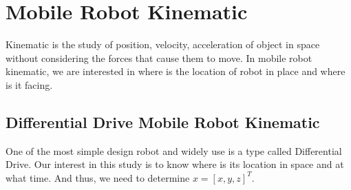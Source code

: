 \chapter{Mobile Robot Kinematic}
Kinematic is the study of position, velocity, acceleration of object in space without considering the forces that cause them to move. In mobile robot kinematic, we are interested in where is the location of robot in place and where is it facing.

\section{Differential Drive Mobile Robot Kinematic}
One of the most simple design robot and widely use is a type called Differential Drive. Our interest in this study is to know where is its location in space and at what time. And thus, we need to determine $x = [x,y,z]^T$.

